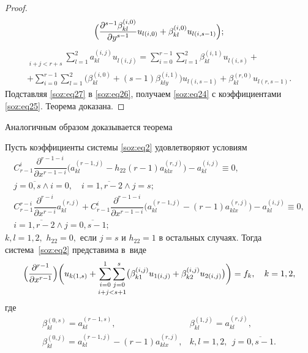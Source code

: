 \begin{proof}
\begin{multline}
\Bigl(\frac{\partial^{s-1}\beta_{kl}^{(i,0)}}{\partial y^{s-1}}u_{l(i,0)}+\beta_{kl}^{(i,0)}u_{l(i,s-1)}\Bigr);
\end{multline}
\begin{multline}
\mathop{\sum\limits_{i=0}^{r}\sum\limits_{j=s-1}^{s}}\limits_{i + j < r+s}\sum\limits_{l=1}^{2} a_{kl}^{(i,j)}u_{l(i,j)}=\sum\limits_{i=0}^{r-1}\sum\limits_{l=1}^{2} \beta_{kl}^{(i,1)}u_{l(i,s)}+
\\
+\sum\limits_{i=0}^{r-1}\sum\limits_{l=1}^{2} \bigl(\beta_{kl}^{(i,0)}+(s-1)\beta_{kly}^{(i,1)}\bigr)u_{l(i,s-1)}+\beta_{kl}^{(r,0)}u_{l(r,s-1)}.
\end{multline}
Подставляя \eqref{soz:eq27}  в \eqref{soz:eq26}, получаем \eqref{soz:eq24}  с коэффициентами \eqref{soz:eq25}. Теорема доказана.
\end{proof} 

\smallskip

Аналогичным образом доказывается теорема

\medskip
\hypertarget{soz:th6}{}
\begin{theorem}[6]Пусть коэффициенты системы \eqref{soz:eq2}  удовлетворяют условиям
  \begin{equation}
\begin{array}{c}
C_{r-1}^{i}\dfrac{\partial^{r-1-i}}{\partial x^{r-1-i}} \bigl(a_{kl}^{(r-1,j)}-h_{22}(r-1)a_{klx}^{(r,j)} \bigr)-a_{kl}^{(i,j)}\equiv0,\\[2mm]
j=\overline{0,s}\wedge i=0,\quad i=\overline{1,r-2}\wedge j=s;
\\[4mm]
C_{r-1}^{r-i}\dfrac{\partial^{r-i}}{\partial x^{r-i}}a_{kl}^{(r,j)}+C_{r-1}^{i}\dfrac{\partial^{r-1-i}}{\partial x^{r-1-i}} 
\bigl(a_{kl}^{(r-1,j)}-(r-1)a_{klx}^{(r,j)}\bigr)-a_{kl}^{(i,j)}\equiv0,\\[2mm]
i=\overline{1,r-2}\wedge j=\overline{0, s-1};
\end{array}
\label{soz:eq28}
\end{equation}
 $k, l=1, 2,$ $h_{22}=0,$ если $j=s$ и $h_{22}=1$ в остальных случаях$.$ 
 Тогда система~\eqref{soz:eq2}  представима в~виде
 \begin{equation}
\Bigl(\frac{\partial^{r-1}}{\partial x^{r-1}} \Bigr)
\biggl(u_{k(1,s)}+\mathop{\sum\limits_{i=0}^{1}\sum\limits_{j=0}^{s}}\limits_{i + j < s+1} 
\bigl(\beta_{k1}^{(i,j)}u_{1(i,j)}+\beta_{k2}^{(i,j)}u_{2(i,j)}\bigr)\biggr)=f_{k}, \quad  k=1, 2,
\end{equation}
 где
  \begin{equation*}
\begin{array}{rl}
\beta_{kl}^{(0,s)}=a_{kl}^{(r-1,s)}, &  \beta_{kl}^{(1,j)}=a_{kl}^{(r,j)},\\ \beta_{kl}^{(0,j)}=a_{kl}^{(r-1,j)}-(r-1)a_{klx}^{(r,j)}, & k, l=1, 2,\ \ j=\overline{0, s-1}.
\end{array}
\end{equation*}

\end{theorem}
\medskip


